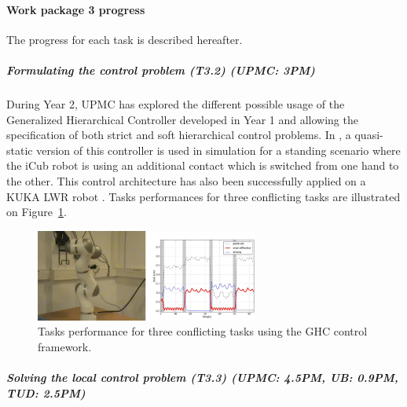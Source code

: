  
\paragraph{Work package 3 progress}

The progress for each task is described hereafter.

\subparagraph{Formulating the control problem (T3.2) (UPMC: 3PM)}

During Year 2, UPMC has explored the different possible usage of the Generalized Hierarchical Controller developed in Year 1 \cite{LiuGHC} and allowing the specification of both strict and soft hierarchical control problems. In \cite{LiuAutRobSpecIssue}, a quasi-static version of this controller is used in simulation for a standing scenario where the iCub robot is using an additional contact which is switched from one hand to the other. This control architecture has also been successfully applied on a KUKA LWR robot \cite{LiuICRA2015}. Tasks performances for three conflicting tasks are illustrated on Figure~\ref{fig:KUKA_LWR_GHC}.

\begin{figure}[h!]
\centering
\includegraphics[width=0.65\textwidth]{images/KUKA_GHC_ICRA}
\caption{Tasks performance for three conflicting tasks using the GHC control framework.}
\label{fig:KUKA_LWR_GHC}
\end{figure}

\subparagraph{Solving the local control problem (T3.3) (UPMC: 4.5PM, UB: 0.9PM, TUD: 2.5PM)}

